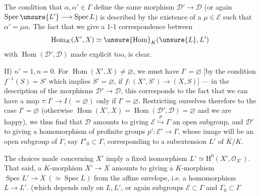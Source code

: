 The condition that $\alpha,\alpha'\in\Gamma$ define the same morphism $\mathcal D'\longrightarrow\mathcal D$ (or again $\operatorname{Spec}\unsure{L'}\longrightarrow\operatorname{Spec}L$) is described by the existence of a $\mu\in\mathcal E$  such that $\alpha'=\mu\alpha$.
The fact that we give a $1$-$1$ correspondence between
\[
\operatorname{Hom}_{K}(X',X)\simeq\unsure{\operatorname{Hom}}_{K}(\unsure{L},L')
\]
with $\operatorname{Hom}(\mathcal D',\mathcal D)$ made explicit too, is clear.

II) $n'=1,n=0$.
 For $\operatorname{Hom}(X',X)\ne\varnothing$, we must have $I'=\varnothing$
[by the condition $f^{-1}(S)=S'$ which implies $S'=\varnothing$, if $f:(X',S')\longrightarrow(X,S)$]
---  in the description of the morphisms $\mathcal D'\longrightarrow\mathcal D$, this corresponds to the fact that we can have a map $\tau:I'\longrightarrow I(=\varnothing)$ only if $I'=\varnothing$.
Restricting ourselves therefore to the case $I'=\varnothing$ (otherwise $\operatorname{Hom}(X',X)=\operatorname{Hom}(\mathcal D',\mathcal D)=\varnothing$ and we are happy), we thus find that $\mathcal D$ amounts to giving $\mathcal E\overset{p}{\hookrightarrow}\Gamma$ an open subgroup, and $\mathcal D'$ to giving a homomorphism of profinite groups $p':\mathcal E'\longrightarrow\Gamma$, whose image will be an open subgroup of $\Gamma$, say $\Gamma'_0\subset\Gamma$, corresponding to a  subextension $L'$ of $\overline K/K$.

The choices made concerning $X'$ imply  a fixed isomorphism $L'\simeq\mathrm H^0(X',\mathcal O_{X'})$.
That said, a $K$-morphism  $X'\longrightarrow X$ amounts  to giving a $K$-morphism $\operatorname{Spec}L'\longrightarrow X\ (\simeq\operatorname{Spec}L)$ from the affine envelope, i.e. a homomorphism $L\longrightarrow L'$.
(which depends only on $L,L'$, or again   subgroups $\mathcal E\subset\Gamma$ and $\Gamma_0\subset\Gamma$

